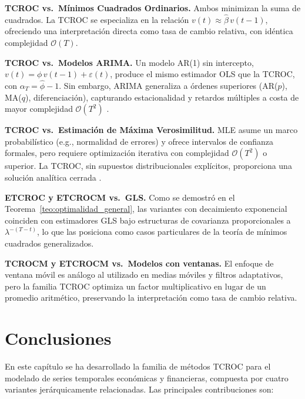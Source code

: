 \textbf{TCROC vs.\ Mínimos Cuadrados Ordinarios.} Ambos minimizan la suma de cuadrados. La TCROC se especializa en la relación \(v(t) \approx \hat{\beta}\,v(t-1)\), ofreciendo una interpretación directa como tasa de cambio relativa, con idéntica complejidad \(\mathcal{O}(T)\).

\textbf{TCROC vs.\ Modelos ARIMA.} Un modelo AR(1) sin intercepto, \(v(t) = \phi\,v(t-1) + \varepsilon(t)\), produce el mismo estimador OLS que la TCROC, con \(\alpha_T = \hat{\phi} - 1\). Sin embargo, ARIMA generaliza a órdenes superiores (AR($p$), MA($q$), diferenciación), capturando estacionalidad y retardos múltiples a costa de mayor complejidad \(\mathcal{O}(T^2)\) \cite{Box2015}.

\textbf{TCROC vs.\ Estimación de Máxima Verosimilitud.} MLE asume un marco probabilístico (e.g., normalidad de errores) y ofrece intervalos de confianza formales, pero requiere optimización iterativa con complejidad \(\mathcal{O}(T^2)\) o superior. La TCROC, sin supuestos distribucionales explícitos, proporciona una solución analítica cerrada \cite{Greene2018}.

\textbf{ETCROC y ETCROCM vs.\ GLS.} Como se demostró en el Teorema~\ref{teo:optimalidad_general}, las variantes con decaimiento exponencial coinciden con estimadores GLS bajo estructuras de covarianza proporcionales a \(\lambda^{-(T-t)}\), lo que las posiciona como casos particulares de la teoría de mínimos cuadrados generalizados.

\textbf{TCROCM y ETCROCM vs.\ Modelos con ventanas.} El enfoque de ventana móvil es análogo al utilizado en medias móviles y filtros adaptativos, pero la familia TCROC optimiza un factor multiplicativo en lugar de un promedio aritmético, preservando la interpretación como tasa de cambio relativa.


\section{Conclusiones}
\label{sec:tcroc_conclusiones}

En este capítulo se ha desarrollado la familia de métodos TCROC para el modelado de series temporales económicas y financieras, compuesta por cuatro variantes jerárquicamente relacionadas. Las principales contribuciones son:

